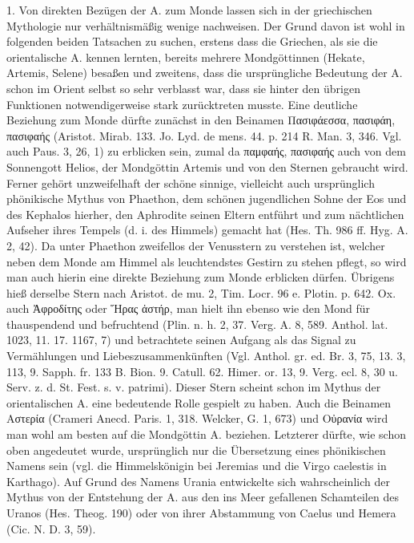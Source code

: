 \documentclass[a4paper, 11pt, oneside]{article}
\begin{document}
1. Von direkten Bezügen der A. zum Monde lassen sich in der griechischen Mythologie nur verhältnismäßig wenige nachweisen. Der Grund davon ist wohl in folgenden beiden Tatsachen zu suchen, erstens dass die Griechen, als sie die orientalische A. kennen lernten, bereits mehrere Mondgöttinnen (Hekate, Artemis, Selene) besaßen und zweitens, dass die ursprüngliche Bedeutung der A. schon im Orient selbst so sehr verblasst war, dass sie hinter den übrigen Funktionen notwendigerweise stark zurücktreten musste. Eine deutliche Beziehung zum Monde dürfte zunächst in den Beinamen Πασιφάεσσα, πασιφάη, πασιφαής (Aristot. Mirab. 133. Jo. Lyd. de mens. 44. p. 214 R. Man. 3, 346. Vgl. auch Paus. 3, 26, 1) zu erblicken sein, zumal da παμφαής, πασιφαής auch von dem Sonnengott Helios, der Mondgöttin Artemis und von den Sternen gebraucht wird. Ferner gehört unzweifelhaft der schöne sinnige, vielleicht auch ursprünglich phönikische Mythus von Phaethon, dem schönen jugendlichen Sohne der Eos und des Kephalos hierher, den Aphrodite seinen Eltern entführt und zum nächtlichen Aufseher ihres Tempels (d. i. des Himmels) gemacht hat (Hes. Th. 986 ff. Hyg. A. 2, 42). Da unter Phaethon zweifellos der Venusstern zu verstehen ist, welcher neben dem Monde am Himmel als leuchtendstes Gestirn zu stehen pflegt, so wird man auch hierin eine direkte Beziehung zum Monde erblicken dürfen. Übrigens hieß derselbe Stern nach Aristot. de mu. 2, Tim. Locr. 96 e. Plotin. p. 642. Ox. auch Ἀφροδίτης oder Ἥρας ἀστήρ, man hielt ihn ebenso wie den Mond für thauspendend und befruchtend (Plin. n. h. 2, 37. Verg. A. 8, 589. Anthol. lat. 1023, 11. 17. 1167, 7) und betrachtete seinen Aufgang als das Signal zu Vermählungen und Liebeszusammenkünften (Vgl. Anthol. gr. ed. Br. 3, 75, 13. 3, 113, 9. Sapph. fr. 133 B. Bion. 9. Catull. 62. Himer. or. 13, 9. Verg. ecl. 8, 30 u. Serv. z. d. St. Fest. s. v. patrimi). Dieser Stern scheint schon im Mythus der orientalischen A. eine bedeutende Rolle gespielt zu haben. Auch die Beinamen Αστερία (Crameri Anecd. Paris. 1, 318. Welcker, G. 1, 673) und Οὐρανία wird man wohl am besten auf die Mondgöttin A. beziehen. Letzterer dürfte, wie schon oben angedeutet wurde, ursprünglich nur die Übersetzung eines phönikischen Namens sein (vgl. die Himmelskönigin bei Jeremias und die Virgo caelestis in Karthago). Auf Grund des Namens Urania entwickelte sich wahrscheinlich der Mythus von der Entstehung der A. aus den ins Meer gefallenen Schamteilen des Uranos (Hes. Theog. 190) oder von ihrer Abstammung von Caelus und Hemera (Cic. N. D. 3, 59).
\end{document}
